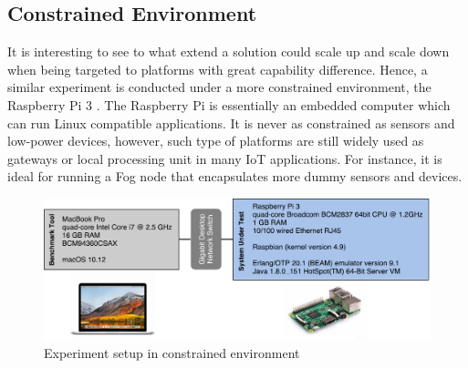 


\subsection{Constrained Environment}

It is interesting to see to what extend a solution could scale up and scale down when being targeted to platforms with great capability difference. Hence, a similar experiment is conducted under a more constrained environment, the Raspberry Pi 3 \autocite{raspberry_pi}. The Raspberry Pi is essentially an embedded computer which can run Linux compatible applications. It is never as constrained as sensors and low-power devices, however, such type of platforms are still widely used as gateways or local processing unit in many IoT applications. For instance, it is ideal for running a Fog node that encapsulates more dummy sensors and devices.

\begin{figure}[!htbp]
\centering
\includegraphics[scale = 0.6]{experiment_setting_rasp}
\caption{Experiment setup in constrained environment}
\label{fig:experiment_setting_rasp}
\end{figure}

